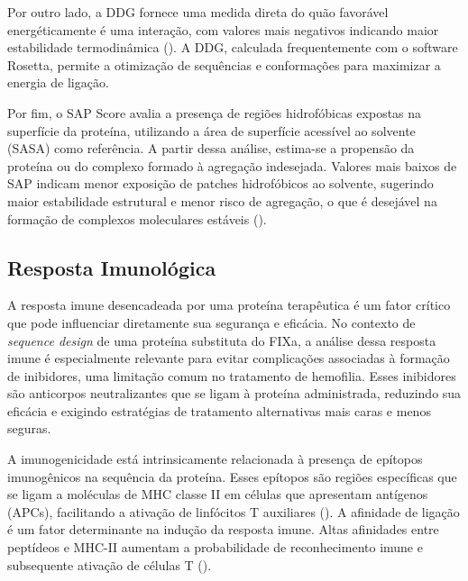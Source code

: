Por outro lado, a DDG fornece uma medida direta do quão favorável energéticamente é uma interação,
com valores mais negativos indicando maior estabilidade termodinâmica (\cite{Docking}). 
A DDG, calculada frequentemente com o software Rosetta, 
permite a otimização de sequências e conformações para maximizar a energia de ligação.

Por fim, o SAP Score avalia a presença de regiões hidrofóbicas expostas na superfície da proteína, 
utilizando a área de superfície acessível ao solvente (SASA) como referência. 
A partir dessa análise, estima-se a propensão da proteína ou do complexo formado à agregação indesejada.
Valores mais baixos de SAP indicam menor exposição de patches hidrofóbicos ao solvente,
sugerindo maior estabilidade estrutural e menor risco de agregação, o que é desejável na formação de complexos moleculares estáveis
(\cite{Docking}).





\subsection{Resposta Imunológica}
\label{subsection:RespImuno} 

A resposta imune desencadeada por uma proteína terapêutica é um fator crítico 
que pode influenciar diretamente sua segurança e eficácia. 
No contexto de \textit{sequence design} de uma proteína substituta do FIXa,
a análise dessa resposta imune é especialmente relevante para evitar complicações associadas à formação de inibidores,
uma limitação comum no tratamento de hemofilia. 
Esses inibidores são anticorpos neutralizantes que se ligam à proteína administrada,
reduzindo sua eficácia e exigindo estratégias de tratamento alternativas mais caras e menos seguras.

A imunogenicidade está intrinsicamente relacionada à presença de epítopos imunogênicos na sequência da proteína. 
Esses epítopos são regiões específicas que se ligam a moléculas de MHC classe II em células 
que apresentam antígenos (APCs), 
facilitando a ativação de linfócitos T auxiliares (\cite{Imuno}). 
A afinidade de ligação é um fator determinante na indução da resposta imune. 
Altas afinidades entre peptídeos e MHC-II aumentam a probabilidade 
de reconhecimento imune e subsequente ativação de células T (\cite{Imuno}).

